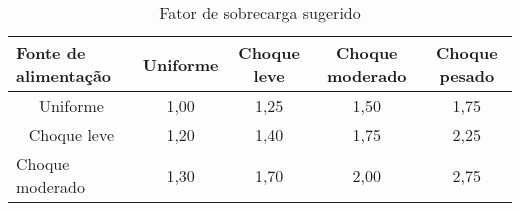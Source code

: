 \begin{table}[]
\centering
\caption{\label{tab:1} Fator de sobrecarga sugerido}
\begin{tabular}{l c c c c}
\hline

\textbf{Fonte de alimentação}     & \textbf{Uniforme}         & \textbf{Choque leve}      & \textbf{Choque moderado}  & \textbf{Choque pesado}    \\ \hline
\multicolumn{1}{c}{Uniforme}    & \multicolumn{1}{c}{1,00} & \multicolumn{1}{c}{1,25} & \multicolumn{1}{c}{1,50} & \multicolumn{1}{c}{1,75} \\ \hline
\multicolumn{1}{c}{Choque leve} & \multicolumn{1}{c}{1,20} & \multicolumn{1}{c}{1,40} & \multicolumn{1}{c}{1,75} & \multicolumn{1}{c}{2,25} \\ \hline
Choque moderado                   & 1,30                      & 1,70                      & 2,00                      & 2,75                      \\ \hline
\end{tabular}
\end{table}